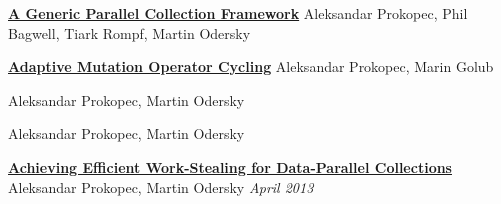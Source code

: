 \documentclass[9pt]{article}
\begin{document}
\noindent\href{http://infoscience.epfl.ch/record/165523/files/techrep.pdf}
{\bf A Generic Parallel Collection Framework}
\newline
\noindent Aleksandar Prokopec, Phil Bagwell, Tiark Rompf, Martin Odersky
\newline
{}
\bigskip

\noindent\href{http://axel22.github.io/resources/docs/icadiwt_atga.pdf}
{\bf Adaptive Mutation Operator Cycling}
\newline
\noindent Aleksandar Prokopec, Marin Golub
\newline
{}
\newline
{}
\bigskip

\medskip


\dates{}
\newline\noindent Aleksandar Prokopec, Martin Odersky
\medskip

\dates{}
\newline\noindent Aleksandar Prokopec, Martin Odersky
\medskip



\noindent\href{http://infoscience.epfl.ch/record/186071}
{\bf  Achieving Efficient Work-Stealing for Data-Parallel Collections}
\dates{}
\newline\noindent Aleksandar Prokopec, Martin Odersky
\newline\noindent\emph{April 2013}
\medskip
\end{document}
